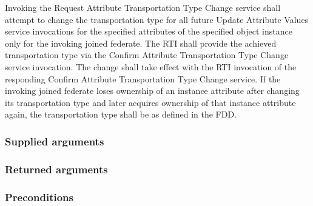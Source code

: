 \begin{compactstdpage}

    Invoking the Request Attribute Transportation Type Change service shall attempt to change the transportation type for all future Update Attribute Values service invocations for the specified attributes of the specified object instance only for the invoking joined federate. The RTI shall provide the achieved transportation type via the Confirm Attribute Transportation Type Change \rtiinitiated{} service invocation. The change shall take effect with the RTI invocation of the responding Confirm Attribute Transportation Type Change \rtiinitiated{} service. If the invoking joined federate loses ownership of an instance attribute after changing its transportation type and later acquires ownership of that instance attribute again, the transportation type shall be as defined in the FDD.

    \subsubsection{Supplied arguments}



    \subsubsection{Returned arguments}



    \subsubsection{Preconditions}




\end{compactstdpage}
